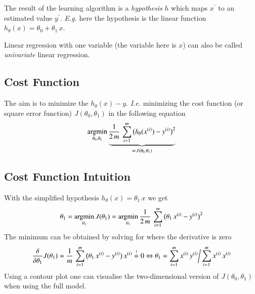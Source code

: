 \documentclass[a4paper,twoside,10pt]{article}
\begin{document}
The result of the learning algorithm is a \emph{hypothesis} $h$ which maps $x^\prime$ to an estimated value $y^\prime$.
\emph{E.g.} here the hypothesis is the linear function $h_\theta(x)=\theta_0+\theta_1\,x$.

Linear regression with one variable (the variable here is $x$) can also be called \emph{univariate} linear regression.

\subsection{Cost Function}\label{cha:costfunction}
The aim is to minimize the $h_\theta(x)-y$.
\emph{I.e.} minimizing the cost function (or square error function) $J(\theta_0,\theta_1)$ in the following equation
\begin{equation*}
  \displaystyle\mathop{\operatorname{argmin}}_{\theta_0,\theta_1}\underbrace{\frac{1}{2\,m}\,\displaystyle\sum_{i=1}^m\big(h_\theta(x^{(i)})-y^{(i)}\big)^2}_{\eqqcolon J(\theta_0,\theta_1)}
\end{equation*}

\subsection{Cost Function Intuition}
With the simplified hypothesis $h_\theta(x)=\theta_1\,x$ we get
\begin{equation*}
  \theta_1=\mathop{\operatorname{argmin}}_{\theta_1}J(\theta_1)=\mathop{\operatorname{argmin}}_{\theta_1}\frac{1}{2\,m}\,\displaystyle\sum_{i=1}^m\big(\theta_1\,x^{(i)}-y^{(i)}\big)^2
\end{equation*}
The minimum can be obtained by solving for where the derivative is zero
\begin{equation*}
  \frac{\delta}{\delta\theta_1}J(\theta_1)=\frac{1}{m}\,\displaystyle\sum_{i=1}^m\big(\theta_1\,x^{(i)}-y^{(i)}\big)\,x^{(i)}\overset{!}{=}0\Leftrightarrow
  \theta_1=\displaystyle\sum_{i=1}^mx^{(i)}\,y^{(i)}\bigg/\displaystyle\sum_{i=1}^mx^{(i)}\,x^{(i)}
\end{equation*}
Using a contour plot one can visualise the two-dimensional version of $J(\theta_0,\theta_1)$ when using the full model.
\end{document}
